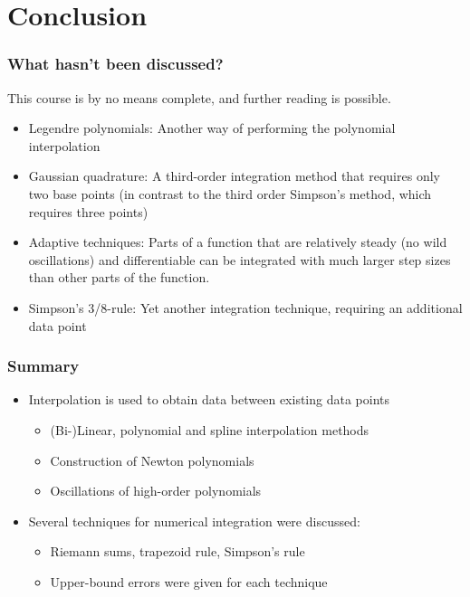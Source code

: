 \documentclass[11pt,table,final,fleqn,xcolor={usenames,dvipsnames,table}]{beamer}
\begin{document}
\section{Conclusion}
\begin{frame}
  \frametitle{What hasn't been discussed?}
  This course is by no means complete, and further reading is possible.
   \begin{itemize}
      \item Legendre polynomials: Another way of performing the polynomial interpolation
      \item Gaussian quadrature: A third-order integration method that requires only two base points (in contrast to the third order Simpson's method, which requires three points)
      \item Adaptive techniques: Parts of a function that are relatively steady (no wild oscillations) and differentiable can be integrated with much larger step sizes than other parts of the function.
      \item Simpson's 3/8-rule: Yet another integration technique, requiring an additional data point
   \end{itemize}
\end{frame}

\begin{frame}
  \frametitle{Summary}
  \begin{itemize}
    \item Interpolation is used to obtain data between existing data points
    \begin{itemize}
      \item (Bi-)Linear, polynomial and spline interpolation methods
      \item Construction of Newton polynomials
      \item Oscillations of high-order polynomials
    \end{itemize}
    \item Several techniques for numerical integration were discussed:
    \begin{itemize}
      \item Riemann sums, trapezoid rule, Simpson's rule
      \item Upper-bound errors were given for each technique
    \end{itemize}
  \end{itemize}
\end{frame}
\end{document}
